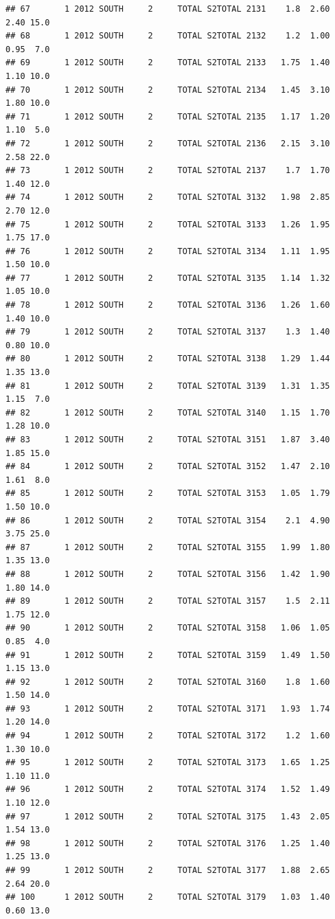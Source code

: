 \documentclass[
]{article}
\begin{document}
\begin{verbatim}
## 67       1 2012 SOUTH     2     TOTAL S2TOTAL 2131    1.8  2.60  2.40 15.0
## 68       1 2012 SOUTH     2     TOTAL S2TOTAL 2132    1.2  1.00  0.95  7.0
## 69       1 2012 SOUTH     2     TOTAL S2TOTAL 2133   1.75  1.40  1.10 10.0
## 70       1 2012 SOUTH     2     TOTAL S2TOTAL 2134   1.45  3.10  1.80 10.0
## 71       1 2012 SOUTH     2     TOTAL S2TOTAL 2135   1.17  1.20  1.10  5.0
## 72       1 2012 SOUTH     2     TOTAL S2TOTAL 2136   2.15  3.10  2.58 22.0
## 73       1 2012 SOUTH     2     TOTAL S2TOTAL 2137    1.7  1.70  1.40 12.0
## 74       1 2012 SOUTH     2     TOTAL S2TOTAL 3132   1.98  2.85  2.70 12.0
## 75       1 2012 SOUTH     2     TOTAL S2TOTAL 3133   1.26  1.95  1.75 17.0
## 76       1 2012 SOUTH     2     TOTAL S2TOTAL 3134   1.11  1.95  1.50 10.0
## 77       1 2012 SOUTH     2     TOTAL S2TOTAL 3135   1.14  1.32  1.05 10.0
## 78       1 2012 SOUTH     2     TOTAL S2TOTAL 3136   1.26  1.60  1.40 10.0
## 79       1 2012 SOUTH     2     TOTAL S2TOTAL 3137    1.3  1.40  0.80 10.0
## 80       1 2012 SOUTH     2     TOTAL S2TOTAL 3138   1.29  1.44  1.35 13.0
## 81       1 2012 SOUTH     2     TOTAL S2TOTAL 3139   1.31  1.35  1.15  7.0
## 82       1 2012 SOUTH     2     TOTAL S2TOTAL 3140   1.15  1.70  1.28 10.0
## 83       1 2012 SOUTH     2     TOTAL S2TOTAL 3151   1.87  3.40  1.85 15.0
## 84       1 2012 SOUTH     2     TOTAL S2TOTAL 3152   1.47  2.10  1.61  8.0
## 85       1 2012 SOUTH     2     TOTAL S2TOTAL 3153   1.05  1.79  1.50 10.0
## 86       1 2012 SOUTH     2     TOTAL S2TOTAL 3154    2.1  4.90  3.75 25.0
## 87       1 2012 SOUTH     2     TOTAL S2TOTAL 3155   1.99  1.80  1.35 13.0
## 88       1 2012 SOUTH     2     TOTAL S2TOTAL 3156   1.42  1.90  1.80 14.0
## 89       1 2012 SOUTH     2     TOTAL S2TOTAL 3157    1.5  2.11  1.75 12.0
## 90       1 2012 SOUTH     2     TOTAL S2TOTAL 3158   1.06  1.05  0.85  4.0
## 91       1 2012 SOUTH     2     TOTAL S2TOTAL 3159   1.49  1.50  1.15 13.0
## 92       1 2012 SOUTH     2     TOTAL S2TOTAL 3160    1.8  1.60  1.50 14.0
## 93       1 2012 SOUTH     2     TOTAL S2TOTAL 3171   1.93  1.74  1.20 14.0
## 94       1 2012 SOUTH     2     TOTAL S2TOTAL 3172    1.2  1.60  1.30 10.0
## 95       1 2012 SOUTH     2     TOTAL S2TOTAL 3173   1.65  1.25  1.10 11.0
## 96       1 2012 SOUTH     2     TOTAL S2TOTAL 3174   1.52  1.49  1.10 12.0
## 97       1 2012 SOUTH     2     TOTAL S2TOTAL 3175   1.43  2.05  1.54 13.0
## 98       1 2012 SOUTH     2     TOTAL S2TOTAL 3176   1.25  1.40  1.25 13.0
## 99       1 2012 SOUTH     2     TOTAL S2TOTAL 3177   1.88  2.65  2.64 20.0
## 100      1 2012 SOUTH     2     TOTAL S2TOTAL 3179   1.03  1.40  0.60 13.0

\end{verbatim}
\end{document}
